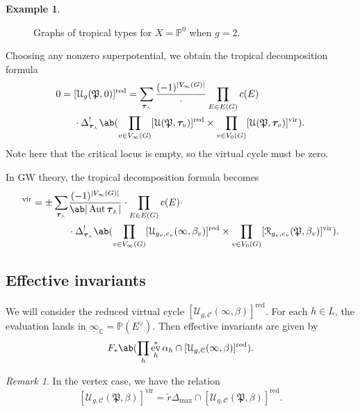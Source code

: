 \documentclass[10pt]{amsart}
\theoremstyle{definition}
\newtheorem{exm}[thm]{Example}
\theoremstyle{remark}
\newtheorem{rmk}[thm]{Remark}
\theoremstyle{plain}
\theoremstyle{definition}
\theoremstyle{remark}
\newcommand{\C}{\mathbb{C}}
\renewcommand{\P}{\mathbb{P}}
\newcommand{\Mbar}{\overline{\mathcal{M}}}
\newcommand{\mc}[1]{\mathcal{#1}}
\newcommand{\mf}[1]{\mathfrak{#1}}
\newcommand{\btau}{\bm{\tau}}
\newcommand{\mr}[1]{\mathrm{#1}}
\newcommand{\on}[1]{\operatorname{#1}}
\newcommand{\ul}[1]{\underline{#1}}
\newcommand{\1}{\mathbf{1}}
\newcommand{\2}{\mathbf{2}}
\newcommand{\3}{\mathbf{3}}
\newcommand{\vir}{\mr{vir}}
\newcommand{\red}{\mr{red}}
\DeclareMathOperator{\Aut}{Aut}
\DeclareMathOperator{\ev}{ev}
\begin{document}
\begin{exm}
\begin{figure}[htpb]
\begin{center}
    \end{center}
    \caption{Graphs of tropical types for $X = \P^0$ when $g=2$.}%
    \label{fig:tropgraphs}
    \end{figure}
    Choosing any nonzero superpotential, we obtain the tropical decomposition formula
    \begin{align*}
        0 ={}& [\mc{U}_g(\mf{P},0)]^{\red} = \sum_{\btau_{\curlywedge}} \frac{(-1)^{|V_{\infty}(G)|}} \cdot \prod_{E \in E(G)} c(E) \\
    & \cdot \Delta_{\btau_{\curlywedge}}^! \ab( \prod_{v \in V_{\infty}(G)}[\mc{U}(\mf{P},\btau_{v})]^{\red} \times \prod_{v \in V_0(G)} [\mc{U}(\mf{P},\btau_v)]^{\vir}).
    \end{align*}
    Note here that the critical locus is empty, so the virtual cycle must be zero.
\end{exm}


In GW theory, the tropical decomposition formula becomes
\begin{align*}
    [\Mbar_{g,n}(Z,\beta)]^{\vir} = \pm \sum_{\btau_{\curlywedge}}& \frac{(-1)^{|V_{\infty}(G)|}}{\ab|\Aut \btau_{\curlywedge}|} \cdot \prod_{E \in E(G)} c(E) \cdot \\
    &\cdot \Delta_{\btau_{\curlywedge}}^! \ab(\prod_{v \in V_{\infty}(G)}[\mc{U}_{g_v, e_v}(\infty,\beta_v)]^{\on{red}} \times \prod_{v \in V_0(G)} [\mc{R}_{g_v, e_v}(\mf{P}, \beta_v)]^{\vir}).
\end{align*}

\subsection{Effective invariants}%
\label{sub:Effective invariants}

We will consider the reduced virtual cycle $[\mc{U}_{g,\mc{C}}(\infty, \beta)]^{\on{red}}$. For each $h \in L$, the evaluation lands in $\ul{\infty}_{\C} = \P(E^{\vee})$. Then effective invariants are given by
\[ F_* \ab(\prod_h \ev_h^* \alpha_h \cap [\mc{U}_{g, \mc{C}}(\infty, \beta)]^{\on{red}}). \]

\begin{rmk}
    In the vertex case, we have the relation
    \[ [\mc{U}_{g, \mc{C}}(\mf{P}, \beta)]^{\vir} = \tilde{r} \Delta_{\max} \cap [\mc{U}_{g, \mc{C}}(\mf{P}, \beta)]^{\on{red}}. \]
\end{rmk}
\end{document}
